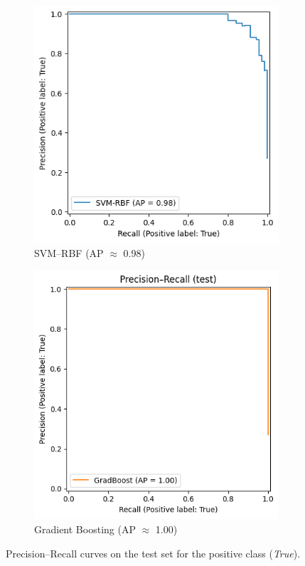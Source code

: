 \documentclass[journal]{IEEEtran}
\begin{document}
\begin{figure}[htbp]
	\centering
	\begin{subfigure}{.48\linewidth}
		\centering
		\includegraphics[width=\linewidth]{assets/svm_pr.png}%
		\caption{SVM--RBF (AP $\approx$ 0.98)}
	\end{subfigure}\hfill
	\begin{subfigure}{.48\linewidth}
		\centering
		\includegraphics[width=\linewidth]{assets/gb_pr.png}%
		\caption{Gradient Boosting (AP $\approx$ 1.00)}
	\end{subfigure}
	\caption{Precision--Recall curves on the test set for the positive class (\emph{True}).}
	\label{fig:pr-nonlinear}
\end{figure}
\end{document}
